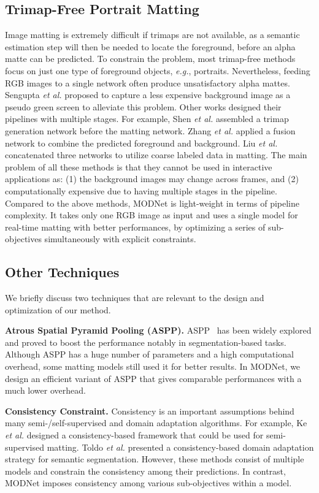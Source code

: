 \documentclass[letterpaper]{article} \usepackage{aaai22}  \usepackage{times}  \usepackage{helvet}  \usepackage{courier}  \usepackage[hyphens]{url}  \usepackage{graphicx} \urlstyle{rm} \def\UrlFont{\rm}  \usepackage{natbib}  \usepackage{caption} \usepackage{booktabs}
\begin{document}
\subsection{Trimap-Free Portrait Matting}
Image matting is extremely difficult if trimaps are not available, as a semantic estimation step will then be needed to locate the foreground, before an alpha matte can be predicted. To constrain the problem, most trimap-free methods focus on just one type of foreground objects, {\it e.g.}, portraits. Nevertheless, feeding RGB images to a single network often produce unsatisfactory alpha mattes. Sengupta {\it et al.} \cite{BM} proposed to capture a less expensive background image as a pseudo green screen to alleviate this problem. Other works designed their pipelines with multiple stages. For example, Shen {\it et al.} \cite{SHM} assembled a trimap generation network before the matting network. Zhang {\it et al.} \cite{LFM} applied a fusion network to combine the predicted foreground and background. Liu {\it et al.} \cite{BSHM} concatenated three networks to utilize coarse labeled data in matting. The main problem of all these methods is that they cannot be used in interactive applications as: (1) the background images may change across frames, and (2) computationally expensive due to having multiple stages in the pipeline.
Compared to the above methods, MODNet is light-weight in terms of pipeline complexity. It takes only one RGB image as input and uses a single model for real-time matting with better performances, by optimizing a series of sub-objectives simultaneously with explicit constraints.

\subsection{Other Techniques}
We briefly discuss two techniques that are relevant to the design and optimization of our method.



\noindent\textbf{Atrous Spatial Pyramid Pooling (ASPP).} ASPP~\cite{chen2017deeplab} has been widely explored and proved to boost the performance notably in segmentation-based tasks. Although ASPP has a huge number of parameters and a high computational overhead, some matting models \cite{HAtt, GCA} still used it for better results. In MODNet, we design an efficient variant of ASPP that gives comparable performances with a much lower overhead.

\noindent\textbf{Consistency Constraint.} Consistency is an important assumptions behind many semi-/self-supervised \cite{semi_un_survey} and domain adaptation \cite{udda_survey} algorithms. For example, Ke {\it et al.} \cite{GCT} designed a consistency-based framework that could be used for semi-supervised matting. Toldo {\it et al.} \cite{udamss}  presented a consistency-based domain adaptation strategy for semantic segmentation. However, these methods consist of multiple models and constrain the consistency among their predictions. In contrast, MODNet imposes consistency among various sub-objectives within a model.
\end{document}
